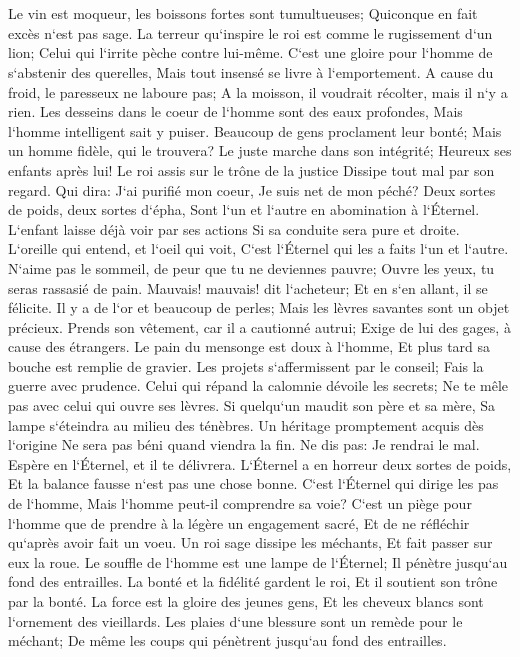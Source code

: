 \chapter{}

\verse Le vin est moqueur, les boissons fortes sont tumultueuses; Quiconque en fait excès n`est pas sage. 
\verse La terreur qu`inspire le roi est comme le rugissement d`un lion; Celui qui l`irrite pèche contre lui-même. 
\verse C`est une gloire pour l`homme de s`abstenir des querelles, Mais tout insensé se livre à l`emportement. 
\verse A cause du froid, le paresseux ne laboure pas; A la moisson, il voudrait récolter, mais il n`y a rien. 
\verse Les desseins dans le coeur de l`homme sont des eaux profondes, Mais l`homme intelligent sait y puiser. 
\verse Beaucoup de gens proclament leur bonté; Mais un homme fidèle, qui le trouvera? 
\verse Le juste marche dans son intégrité; Heureux ses enfants après lui! 
\verse Le roi assis sur le trône de la justice Dissipe tout mal par son regard. 
\verse Qui dira: J`ai purifié mon coeur, Je suis net de mon péché? 
\verse Deux sortes de poids, deux sortes d`épha, Sont l`un et l`autre en abomination à l`Éternel. 
\verse L`enfant laisse déjà voir par ses actions Si sa conduite sera pure et droite. 
\verse L`oreille qui entend, et l`oeil qui voit, C`est l`Éternel qui les a faits l`un et l`autre. 
\verse N`aime pas le sommeil, de peur que tu ne deviennes pauvre; Ouvre les yeux, tu seras rassasié de pain. 
\verse Mauvais! mauvais! dit l`acheteur; Et en s`en allant, il se félicite. 
\verse Il y a de l`or et beaucoup de perles; Mais les lèvres savantes sont un objet précieux. 
\verse Prends son vêtement, car il a cautionné autrui; Exige de lui des gages, à cause des étrangers. 
\verse Le pain du mensonge est doux à l`homme, Et plus tard sa bouche est remplie de gravier. 
\verse Les projets s`affermissent par le conseil; Fais la guerre avec prudence. 
\verse Celui qui répand la calomnie dévoile les secrets; Ne te mêle pas avec celui qui ouvre ses lèvres. 
\verse Si quelqu`un maudit son père et sa mère, Sa lampe s`éteindra au milieu des ténèbres. 
\verse Un héritage promptement acquis dès l`origine Ne sera pas béni quand viendra la fin. 
\verse Ne dis pas: Je rendrai le mal. Espère en l`Éternel, et il te délivrera. 
\verse L`Éternel a en horreur deux sortes de poids, Et la balance fausse n`est pas une chose bonne. 
\verse C`est l`Éternel qui dirige les pas de l`homme, Mais l`homme peut-il comprendre sa voie? 
\verse C`est un piège pour l`homme que de prendre à la légère un engagement sacré, Et de ne réfléchir qu`après avoir fait un voeu. 
\verse Un roi sage dissipe les méchants, Et fait passer sur eux la roue. 
\verse Le souffle de l`homme est une lampe de l`Éternel; Il pénètre jusqu`au fond des entrailles. 
\verse La bonté et la fidélité gardent le roi, Et il soutient son trône par la bonté. 
\verse La force est la gloire des jeunes gens, Et les cheveux blancs sont l`ornement des vieillards. 
\verse Les plaies d`une blessure sont un remède pour le méchant; De même les coups qui pénètrent jusqu`au fond des entrailles. 

